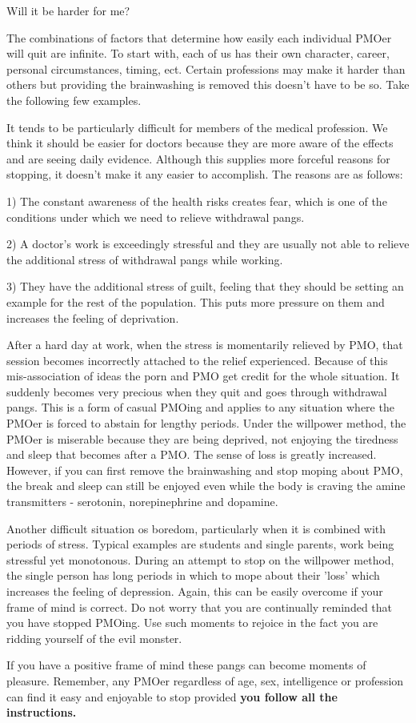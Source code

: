 Will it be harder for me?

The combinations of factors that determine how easily each individual PMOer will quit are infinite. To start with, each of us has their own character, career, personal circumstances, timing, ect. Certain professions may make it harder than others but providing the brainwashing is removed this doesn't have to be so. Take the following few examples.

It tends to be particularly difficult for members of the medical profession. We think it should be easier for doctors because they are more aware of the effects and are seeing daily evidence. Although this supplies more forceful reasons for stopping, it doesn't make it any easier to accomplish. The reasons are as follows:

  1) The constant awareness of the health risks creates fear, which is one of the conditions under which we need to relieve withdrawal pangs.

  2) A doctor's work is exceedingly stressful and they are usually not able to relieve the additional stress of withdrawal pangs while working.

  3) They have the additional stress of guilt, feeling that they should be setting an example for the rest of the population. This puts more pressure on them and increases the feeling of deprivation.

After a hard day at work, when the stress is momentarily relieved by PMO, that session becomes incorrectly attached to the relief experienced. Because of this mis-association of ideas the porn and PMO get credit for the whole situation. It suddenly becomes very precious when they quit and goes through withdrawal pangs. This is a form of casual PMOing and applies to any situation where the PMOer is forced to abstain for lengthy periods. Under the willpower method, the PMOer is miserable because they are being deprived, not enjoying the tiredness and sleep that becomes after a PMO. The sense of loss is greatly increased. However, if you can first remove the brainwashing and stop moping about PMO, the break and sleep can still be enjoyed even while the body is craving the amine transmitters - serotonin, norepinephrine and dopamine.

Another difficult situation os boredom, particularly when it is combined with periods of stress. Typical examples are students and single parents, work being stressful yet monotonous. During an attempt to stop on the willpower method, the single person has long periods in which to mope about their 'loss' which increases the feeling of depression. Again, this can be easily overcome if your frame of mind is correct. Do not worry that you are continually reminded that you have stopped PMOing. Use such moments to rejoice in the fact you are ridding yourself of the evil monster.

If you have a positive frame of mind these pangs can become moments of pleasure. Remember, any PMOer regardless of age, sex, intelligence or profession can find it easy and enjoyable to stop provided \textbf{you follow all the instructions.}
